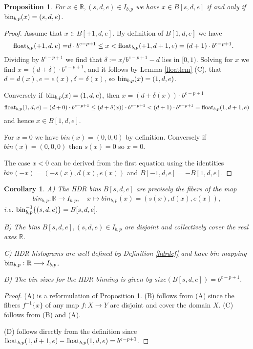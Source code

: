 \documentclass{article}
\theoremstyle{plain}
\newtheorem{proposition}[definition]{Proposition}
\newtheorem{corollary}[definition]{Corollary}
\theoremstyle{remark}
\newcommand{\IR}{\mathbb{R}}
\newcommand{\lra}{\longrightarrow}
\begin{document}
\begin{proposition} \label{hdrprop}
  For $x \in \IR, (s,d,e) \in I_{b,p}$ we have $x \in B[s,d,e]$ if and only if $\mathrm{bin}_{b,p}(x) = (s,d,e)$.
\end{proposition}
\begin{proof}
  Assume that $x \in B[+1,d,e]$. By definition of $B[1,d,e]$ we have
  \begin{align*}
    \mathrm{float}_{b,p}(+1,d,e) = & d \cdot b^{e-p+1} \leq x < \mathrm{float}_{b,p}(+1,d+1, e) = (d+1) \cdot b^{e-p+1}.
  \end{align*}
  Dividing by $b^{e-p+1}$ we find that $\delta := x/b^{e-p+1} - d$ lies in $[0,1)$.
  Solving for $x$ we find $x = (d + \delta) \cdot b^{e-p+1}$, and it follows by
  Lemma \ref{floatlem} (C), that $d=d(x), e=e(x), \delta = \delta(x)$, so $\mathrm{bin}_{b,p}(x) = (1,d,e)$.

  Conversely if $\mathrm{bin}_{b,p}(x) = (1,d,e)$, then $x = (d + \delta(x)) \cdot b^{e - p + 1}$
  \begin{align*}
      \mathrm{float}_{b,p}(1,d,e) = (d + 0) \cdot b^{e - p + 1} \leq (d + \delta(x)) \cdot b^{e - p + 1} <  (d + 1) \cdot b^{e - p + 1} = \mathrm{float}_{b,p}(1,d+1,e)
  \end{align*}
  and hence $x \in B[1,d,e]$.

  For $x = 0$ we have $bin(x) = (0,0,0)$ by definition.
  Conversely if $bin(x) = (0,0,0)$ then $s(x) = 0$ so $x = 0$.

  The case $x < 0$ can be derived from the first equation using the identities $bin(-x)=(-s(x),d(x),e(x))$ and $B[-1,d,e] = -B[1,d,e]$.
\end{proof}

\begin{corollary}
  A) The HDR bins $B[s,d,e]$ are precisely the fibers of the map
  \begin{align*}
    bin_{b,p}: \IR \lra I_{b,p}, \quad x \mapsto bin_{b,p}(x) = (s(x), d(x), e(x) ),
  \end{align*}
  i.e. $\mathrm{bin}_{b,p}^{-1}\{(s,d,e)\} = B[s,d,e].$

  B) The bins $B[s,d,e], (s,d,e) \in I_{b,p}$ are disjoint and collectively cover the real axes $\IR$.

  C) HDR histograms are well defined by Definition \ref{hdrdef} and have bin mapping $\bin_{b,p}: \IR \lra I_{b,p}$.

  D) The bin sizes for the HDR binning is given by $size(B[s,d,e]) = b^{e-p+1}.$
\end{corollary}

\begin{proof}
  (A) is a reformulation of Proposition \ref{hdrprop}.
  (B) follows from (A) since the fibers $f^{-1}\{x\}$ of any map $f:X \rightarrow Y$ are disjoint and cover the domain $X$.
  (C) follows from (B) and (A).

  (D) follows directly from the definition since $\mathrm{float}_{b,p}(1,d+1,e)-\mathrm{float}_{b,p}(1,d,e) = b^{e-p+1}$.
\end{proof}
\end{document}
